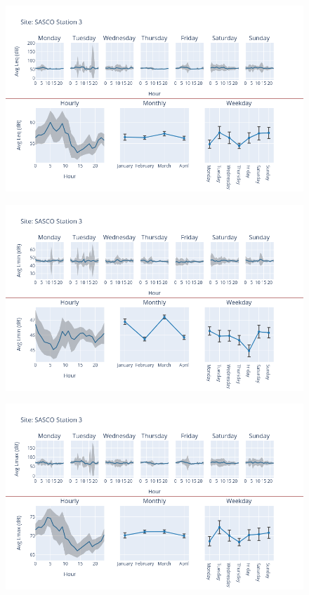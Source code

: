 \documentclass[12pt, oneside]{book}
\begin{document}
{ 
{\begin{figure}[H] 
 \centering 
\includegraphics[width=.88\textwidth, keepaspectratio]{image155} 
 \end{figure}}{} 

{\begin{figure}[H] 
 \centering 
\includegraphics[width=.88\textwidth, keepaspectratio]{image156} 
 \end{figure}}{} 

{\begin{figure}[H] 
 \centering 
\includegraphics[width=.88\textwidth, keepaspectratio]{image157} 
 \end{figure}}{} 

}
\end{document}
